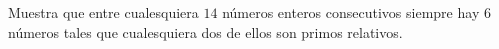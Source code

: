 Muestra que entre cualesquiera $14$ números enteros consecutivos siempre hay $6$ números tales que cualesquiera dos de ellos son primos relativos.